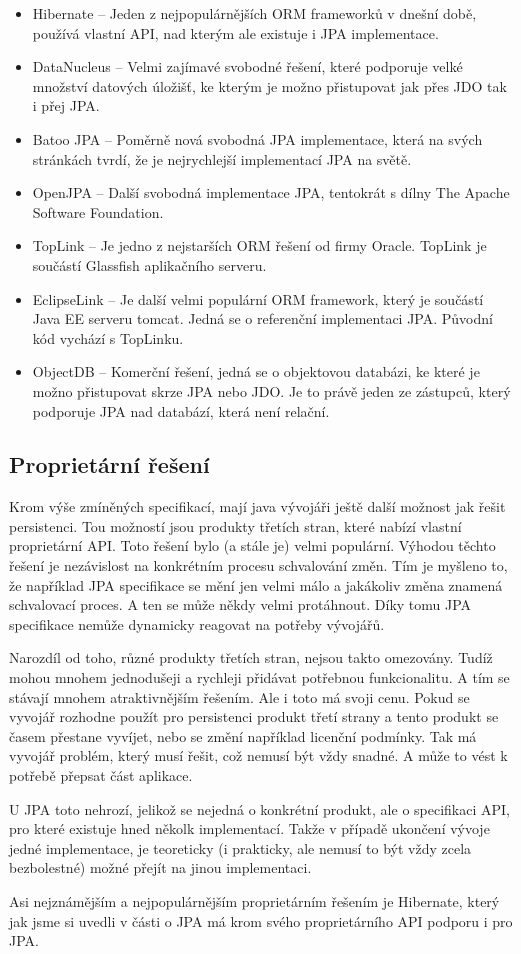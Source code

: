 \begin{itemize}
  \item Hibernate -- Jeden z nejpopulárnějších ORM frameworků v dnešní době, používá vlastní API, nad kterým ale existuje i JPA implementace.
  \item DataNucleus -- Velmi zajímavé svobodné řešení, které podporuje velké množství datových úložišť, ke kterým je možno přistupovat jak přes JDO tak i přej JPA.
  \item Batoo JPA -- Poměrně nová svobodná JPA implementace, která na svých stránkách tvrdí, že je nejrychlejší implementací JPA na světě.
  \item OpenJPA -- Další svobodná implementace JPA, tentokrát s dílny The Apache Software Foundation.
  \item TopLink -- Je jedno z nejstarších ORM řešení od firmy Oracle. TopLink je součástí Glassfish aplikačního serveru.
  \item EclipseLink -- Je další velmi populární ORM framework, který je součástí Java EE serveru tomcat. Jedná se o referenční implementaci JPA. Původní kód vychází s TopLinku.
  \item ObjectDB -- Komerční řešení, jedná se o objektovou databázi, ke které je možno přistupovat skrze JPA nebo JDO. Je to právě jeden ze zástupců, který podporuje JPA nad databází, která není relační.
\end{itemize}

\subsection{Proprietární řešení}
Krom výše zmíněných specifikací, mají java vývojáři ještě další možnost jak řešit persistenci. Tou možností jsou produkty třetích stran, které nabízí vlastní proprietární API. Toto řešení bylo (a stále je) velmi populární. Výhodou těchto řešení je nezávislost na konkrétním procesu schvalování změn. Tím je myšleno to, že například JPA specifikace se mění jen velmi málo a jakákoliv změna znamená schvalovací proces. A ten se může někdy velmi protáhnout. Díky tomu JPA specifikace nemůže dynamicky reagovat na potřeby vývojářů.

Narozdíl od toho, různé produkty třetích stran, nejsou takto omezovány. Tudíž mohou mnohem jednodušeji a rychleji přidávat potřebnou funkcionalitu. A tím se stávají mnohem atraktivnějším řešením. Ale i toto má svoji cenu. Pokud se vyvojář rozhodne použít pro persistenci produkt třetí strany a tento produkt se časem přestane vyvíjet, nebo se změní například licenční podmínky. Tak má vyvojář problém, který musí řešit, což nemusí být vždy snadné. A může to vést k potřebě přepsat část aplikace.

U JPA toto nehrozí, jelikož se nejedná o konkrétní produkt, ale o specifikaci API, pro které existuje hned několk implementací. Takže v případě ukončení vývoje jedné implementace, je teoreticky (i prakticky, ale nemusí to být vždy zcela bezbolestné) možné přejít na jinou implementaci.

Asi nejznámějším a nejpopulárnějším proprietárním řešením je Hibernate, který jak jsme si uvedli v části o JPA má krom svého proprietárního API podporu i pro JPA.
